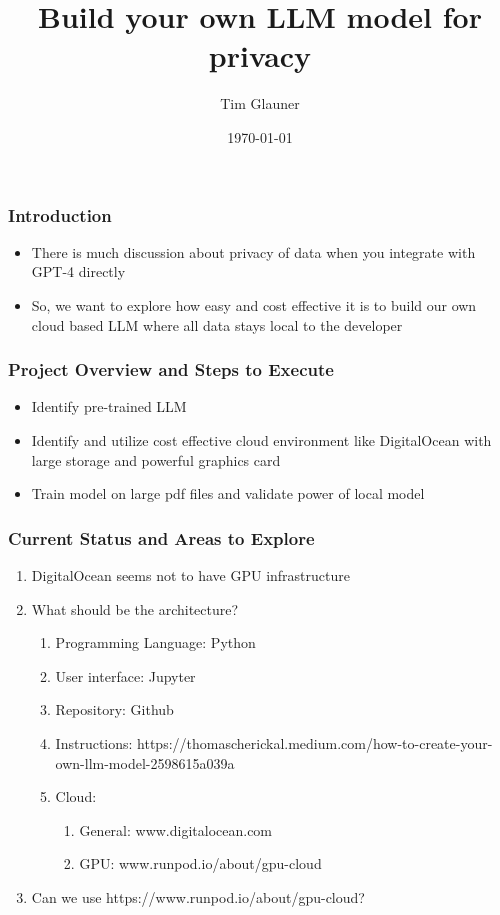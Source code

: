 \documentclass{beamer}
\title{Build your own LLM model for privacy}
\author{Tim Glauner}
\date{\today}
\begin{document}
\frame{\titlepage}

\begin{frame}
	\frametitle{Introduction}
	\begin{itemize}  
		\item There is much discussion about privacy of data when you integrate with GPT-4 directly
		\item So, we want to explore how easy and cost effective it is to build our own cloud based LLM where all data stays local to the developer
	\end{itemize}
\end{frame}

\begin{frame}
  \frametitle{Project Overview and Steps to Execute}
  \begin{itemize}
    \item Identify pre-trained LLM
    \item Identify and utilize cost effective cloud environment like DigitalOcean with large storage and powerful graphics card
    \item Train model on large pdf files and validate power of local model
  \end{itemize}
\end{frame}

\begin{frame}
  \frametitle{Current Status and Areas to Explore}
  \begin{enumerate}
    \item DigitalOcean seems not to have GPU infrastructure
    \item What should be the architecture?
	\begin{enumerate}
		\item Programming Language: Python
		\item User interface: Jupyter
		\item Repository: Github
		\item Instructions: https://thomascherickal.medium.com/how-to-create-your-own-llm-model-2598615a039a
		\item Cloud: 
		\begin{enumerate}
			\item General: www.digitalocean.com
			\item GPU: www.runpod.io/about/gpu-cloud
		\end{enumerate}
	\end{enumerate}
    \item Can we use https://www.runpod.io/about/gpu-cloud?
  \end{enumerate}
\end{frame}
\end{document}
